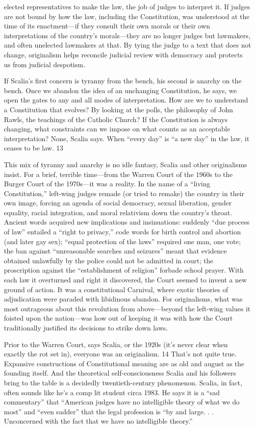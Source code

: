 elected representatives to make the law, the job of judges to interpret it. If judges are not bound by how the law, including the Constitution, was understood at the time of its enactment—if they consult their own morals or their own interpretations of the country’s morals—they are no longer judges but lawmakers, and often unelected lawmakers at that. By tying the judge to a text that does not change, originalism helps reconcile judicial review with democracy and protects us from judicial despotism.{\par} If Scalia’s first concern is tyranny from the bench, his second is anarchy on the bench. Once we abandon the idea of an unchanging Constitution, he says, we open the gates to any and all modes of interpretation. How are we to understand a Constitution that evolves? By looking at the polls, the philosophy of John Rawls, the teachings of the Catholic Church? If the Constitution is always changing, what constraints can we impose on what counts as an acceptable interpretation? None, Scalia says. When “every day” is “a new day” in the law, it ceases to be law. {\color{blue} 13 } {\par} This mix of tyranny and anarchy is no idle fantasy, Scalia and other originalisms insist. For a brief, terrible time—from the Warren Court of the 1960s to the Burger Court of the 1970s—it was a reality. In the name of a “living Constitution,” left-wing judges remade (or tried to remake) the country in their own image, forcing an agenda of social democracy, sexual liberation, gender equality, racial integration, and moral relativism down the country’s throat. Ancient words acquired new implications and insinuations: suddenly “due process of law” entailed a “right to privacy,” code words for birth control and abortion (and later gay sex); “equal protection of the laws” required one man, one vote; the ban against “unreasonable searches and seizures” meant that evidence obtained unlawfully by the police could not be admitted in court; the proscription against the “establishment of religion” forbade school prayer. With each law it overturned and right it discovered, the Court seemed to invent a new ground of action. It was a constitutional Carnival, where exotic theories of adjudication were paraded with libidinous abandon. For originalisms, what was most outrageous about this revolution from above—beyond the left-wing values it foisted upon the nation—was how out of keeping it was with how the Court traditionally justified its decisions to strike down laws.{\par} Prior to the Warren Court, says Scalia, or the 1920s (it’s never clear when exactly the rot set in), everyone was an originalism. {\color{blue} 14 } That’s not quite true. Expansive constructions of Constitutional meaning are as old and august as the founding itself. And the theoretical self-consciousness Scalia and his followers bring to the table is a decidedly twentieth-century phenomenon. Scalia, in fact, often sounds like he’s a comp lit student circa 1983. He says it is a “sad commentary” that “American judges have no intelligible theory of what we do most” and “even sadder” that the legal profession is “by and large. . . Unconcerned with the fact that we have no intelligible theory.” 